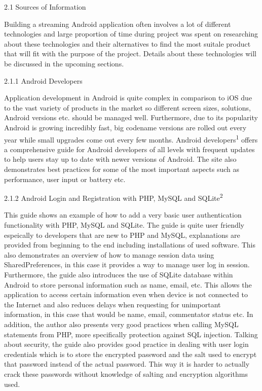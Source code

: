 \documentclass{article}
\begin{document}
\begin{flushleft}
{\Large 2.1 Sources of Information}\par
Building a streaming Android application often involves a lot of different technologies and large proportion of time during project was spent on researching about these technologies and their alternatives to find the most suitale product that will fit with the purpose of the project. Details about these technologies will be discussed in the upcoming sections.\par
{\large 2.1.1 Android Developers}\par
Application development in Android is quite complex in comparison to iOS due to the vast variety of products in the market so different screen sizes, solutions, Android versions etc. should be managed well. Furthermore, due to its popularity Android is growing incredibly fast, big codename versions are rolled out every year while small upgrades come out every few months. Android developers\textsuperscript{1} offers a comprehensive guide for Android developers of all levels with frequent updates to help users stay up to date with newer versions of Android. The site also demonstrates best practices for some of the most important aspects such as performance, user input or battery etc.\par
{\large 2.1.2 Android Login and Registration with PHP, MySQL and SQLite\textsuperscript{2}}\par
This guide shows an example of how to add a very basic user authentication functionality with PHP, MySQL and SQLite. The guide is quite user friendly espeically to developers that are new to PHP and MySQL, explanations are provided from beginning to the end including installations of used software. This also demonstrates an overview of how to manage session data using SharedPreferences, in this case it provides a way to manage user log in session. Furthermore, the guide also introduces the use of SQLite database within Android to store personal information such as name, email, etc. This allows the application to access certain information even when device is not connected to the Internet and also reduces delays when requesting for unimportant information, in this case that would be name, email, commentator status etc. In addition, the author also presents very good practices when calling MySQL statements from PHP, more specifically protection against SQL injection. Talking about security, the guide also provides good practice in dealing with user login credentials which is to store the encrypted password and the salt used to encrypt that password instead of the actual password. This way it is harder to actually crack these passwords without knowledge of salting and encryption algorithms used.\par

\end{flushleft}
\end{document}
